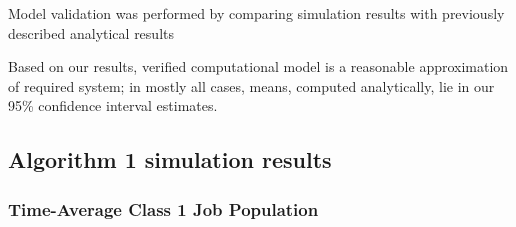 \documentclass[10pt,a4paper]{article}
\begin{document}
Model validation was performed by comparing simulation results with previously described analytical results

Based on our results, verified computational model is a reasonable approximation of required system; in mostly all cases, 
means, computed analytically, lie in our 95\% confidence interval estimates. 


\clearpage
\newpage
\subsection{Algorithm 1 simulation results}


\subsubsection{Time-Average Class 1 Job Population}
\end{document}
